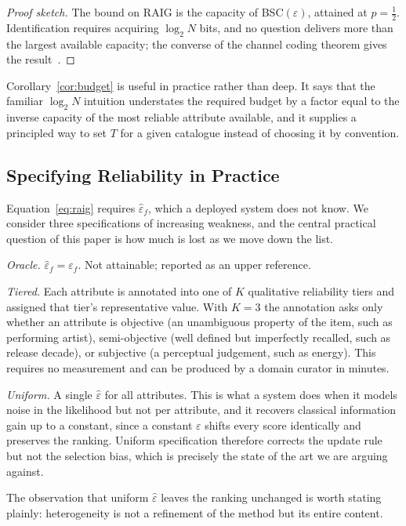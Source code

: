 \documentclass[conference]{IEEEtran}
\newcommand{\RAIG}{\mathrm{RAIG}}
\begin{document}
\begin{proof}[Proof sketch]
The bound on $\RAIG$ is the capacity of BSC$(\varepsilon)$, attained at
$p=\tfrac12$. Identification requires acquiring $\log_2 N$ bits, and no
question delivers more than the largest available capacity; the converse of the
channel coding theorem gives the result~\cite[Ch.~7]{cover2006}.
\end{proof}

Corollary~\ref{cor:budget} is useful in practice rather than deep. It says that
the familiar $\log_2 N$ intuition understates the required budget by a factor
equal to the inverse capacity of the most reliable attribute available, and it
supplies a principled way to set $T$ for a given catalogue instead of choosing
it by convention.

\subsection{Specifying Reliability in Practice}
\label{sec:tiers}

Equation~\eqref{eq:raig} requires $\hat\varepsilon_f$, which a deployed system
does not know. We consider three specifications of increasing weakness, and the
central practical question of this paper is how much is lost as we move down
the list.

\emph{Oracle.} $\hat\varepsilon_f = \varepsilon_f$. Not attainable; reported as
an upper reference.

\emph{Tiered.} Each attribute is annotated into one of $K$ qualitative
reliability tiers and assigned that tier's representative value. With $K=3$ the
annotation asks only whether an attribute is objective (an unambiguous property
of the item, such as performing artist), semi-objective (well defined but
imperfectly recalled, such as release decade), or subjective (a perceptual
judgement, such as energy). This requires no measurement and can be produced by
a domain curator in minutes.

\emph{Uniform.} A single $\hat\varepsilon$ for all attributes. This is what a
system does when it models noise in the likelihood but not per attribute, and
it recovers classical information gain up to a constant, since a constant
$\varepsilon$ shifts every score identically and preserves the ranking. Uniform
specification therefore corrects the update rule but not the selection bias,
which is precisely the state of the art we are arguing against.

The observation that uniform $\hat\varepsilon$ leaves the ranking unchanged is
worth stating plainly: heterogeneity is not a refinement of the method but its
entire content.
\end{document}
